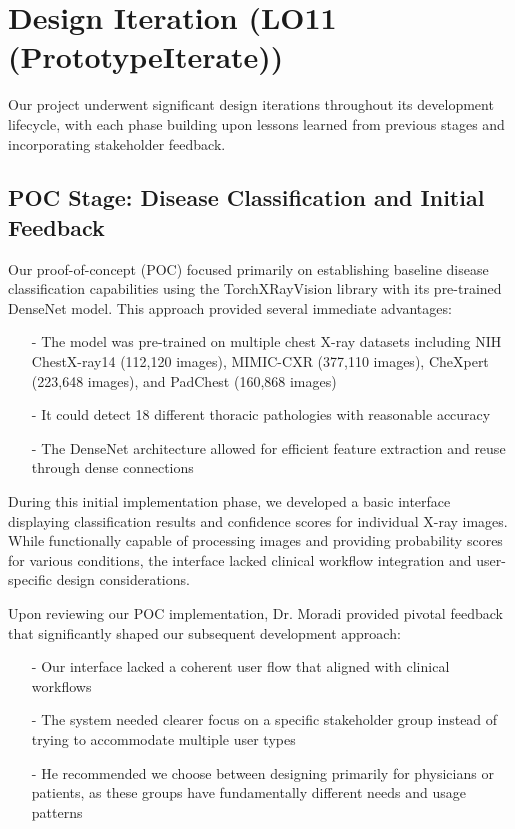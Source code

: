 \documentclass{article}
\begin{document}
\section{Design Iteration (LO11 (PrototypeIterate))}

Our project underwent significant design iterations throughout its development lifecycle, with each phase building upon lessons learned from previous stages and incorporating stakeholder feedback.

\subsection{POC Stage: Disease Classification and Initial Feedback}

Our proof-of-concept (POC) focused primarily on establishing baseline disease classification capabilities using the TorchXRayVision library with its pre-trained DenseNet model. This approach provided several immediate advantages:

\begin{itemize}
    \item[-] The model was pre-trained on multiple chest X-ray datasets including NIH ChestX-ray14 (112,120 images), MIMIC-CXR (377,110 images), CheXpert (223,648 images), and PadChest (160,868 images)
    \item[-] It could detect 18 different thoracic pathologies with reasonable accuracy
    \item[-] The DenseNet architecture allowed for efficient feature extraction and reuse through dense connections
\end{itemize}

During this initial implementation phase, we developed a basic interface displaying classification results and confidence scores for individual X-ray images. While functionally capable of processing images and providing probability scores for various conditions, the interface lacked clinical workflow integration and user-specific design considerations.

Upon reviewing our POC implementation, Dr. Moradi provided pivotal feedback that significantly shaped our subsequent development approach:

\begin{itemize}
    \item[-] Our interface lacked a coherent user flow that aligned with clinical workflows
    \item[-] The system needed clearer focus on a specific stakeholder group instead of trying to accommodate multiple user types
    \item[-] He recommended we choose between designing primarily for physicians or patients, as these groups have fundamentally different needs and usage patterns
\end{itemize}
\end{document}

